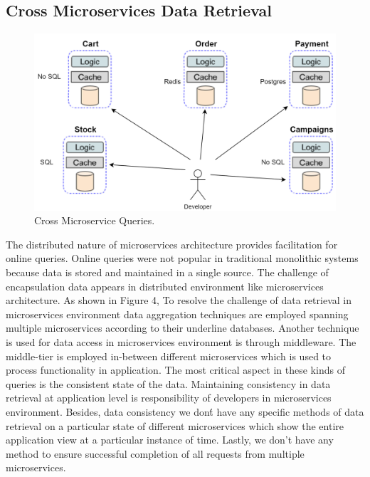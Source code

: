 \documentclass[a4paper,12pt]{article}
\begin{document}
\subsection{Cross Microservices Data Retrieval}
\begin{figure}[h!]
    \begin{center}
	    \includegraphics[width=0.7\columnwidth]{img/Queries.png}
    \end{center}
	\caption{Cross Microservice Queries.}
	\label{fig:microarch}
\end{figure}
The distributed nature of microservices architecture provides facilitation for online queries. Online queries were not popular in traditional monolithic systems because data is stored and maintained in a single source. The challenge of encapsulation data appears in distributed environment like microservices architecture. 
As shown in Figure 4, To resolve the challenge of data retrieval in microservices environment data aggregation techniques are employed spanning multiple microservices according to their underline databases. Another technique is used for data access in microservices environment is through middleware.\cite{cite-39} The middle-tier is employed in-between different microservices which is used to process functionality in application. The most critical aspect in these kinds of queries is the consistent state of the data. Maintaining consistency in data retrieval at application level is responsibility of developers in microservices environment. Besides, data consistency we don\' t have any specific methods of data retrieval on a particular state of different microservices which show the entire application view at a particular instance of time. Lastly, we don't have any method to ensure successful completion of all requests from multiple microservices. \cite{three, fourteen, eighteen}
 
\end{document}
